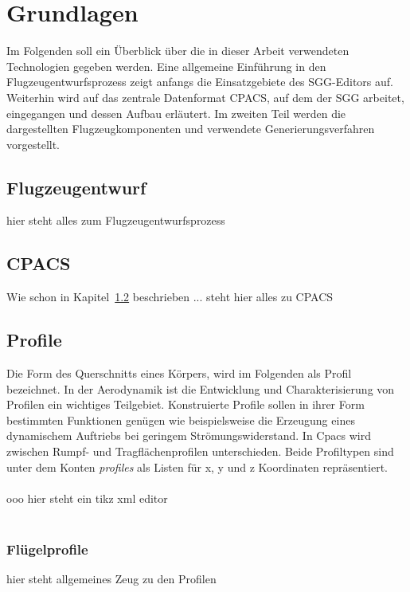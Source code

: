 \chapter{Grundlagen}\label{chp:Grundlagen}
Im Folgenden soll ein \"Uberblick über die in dieser Arbeit verwendeten Technologien gegeben
werden. Eine allgemeine Einf\"uhrung in den Flugzeugentwurfsprozess zeigt anfangs die Einsatzgebiete des SGG-Editors auf.
Weiterhin wird auf das zentrale Datenformat CPACS, auf dem der SGG arbeitet, eingegangen und dessen Aufbau erl\"autert.
Im zweiten Teil werden die dargestellten Flugzeugkomponenten und verwendete Generierungsverfahren vorgestellt.

\section{Flugzeugentwurf}\label{sec:CPACS}
hier steht alles zum Flugzeugentwurfsprozess

\section{CPACS}\label{sec:CPACS}
Wie schon in Kapitel~\ref{sec:CPACS} beschrieben ... steht hier alles zu CPACS

\section{Profile}
Die Form des Querschnitts eines K\"orpers, wird im Folgenden als Profil bezeichnet. In der Aerodynamik ist die Entwicklung und Charakterisierung von Profilen ein wichtiges Teilgebiet. Konstruierte Profile sollen in ihrer Form bestimmten Funktionen gen\"ugen wie beispielsweise die Erzeugung eines dynamischem Auftriebs bei geringem Strömungswiderstand. In Cpacs wird zwischen Rumpf- und Tragfl\"achenprofilen unterschieden. Beide Profiltypen sind unter dem Konten \textit{profiles} als Listen f\"ur x, y und z Koordinaten repr\"asentiert.\\\\

	ooo hier steht ein tikz xml editor\\\\ 

\subsection{Fl\"ugelprofile}
hier steht allgemeines Zeug zu den Profilen





